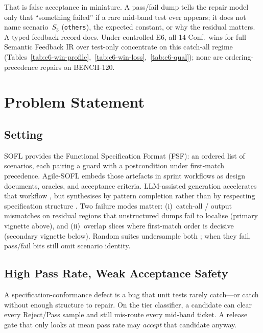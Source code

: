 That is false acceptance in miniature.
A pass/fail dump tells the repair model only that ``something failed'' if a
rare mid-band test ever appears; it does not name scenario~$S_3$
(\texttt{others}), the expected constant, or why the residual matters.
A typed feedback record does.
Under controlled E6, all 14 Conf.\ wins for full Semantic Feedback IR over
test-only concentrate on this catch-all regime
(Tables~\ref{tab:e6-win-profile},~\ref{tab:e6-win-loss},~\ref{tab:e6-qual});
none are ordering-precedence repairs on BENCH-120.



\section{Problem Statement}
\label{sec:intro:problem}

\subsection{Setting}
SOFL \citep{liu1998sofl,liu2004soflbook} provides the Functional Specification
Format (FSF): an ordered list of scenarios, each pairing a guard with a
postcondition under first-match precedence.
Agile-SOFL \citep{li2022qrs_companion} embeds those artefacts in sprint
workflows as design documents, oracles, and acceptance criteria.
LLM-assisted generation accelerates that workflow
\cite{chen2021codex,openai2023gpt4}, but synthesises by pattern completion
rather than by respecting specification structure
\cite{dakhel2023copilot,sun2024clover}.
Two failure modes matter: (i)~catch-all / output mismatches on residual
regions that unstructured dumps fail to localise (primary vignette above),
and (ii)~overlap slices where first-match order is decisive (secondary
vignette below).
Random suites undersample both \citep{zhu1997specification}; when they fail,
pass/fail bits still omit scenario identity.

\subsection{High Pass Rate, Weak Acceptance Safety}
A specification-conformance defect is a bug that unit tests rarely catch---or
catch without enough structure to repair.
On the tier classifier, a candidate can clear every Reject/Pass sample and
still mis-route every mid-band ticket.
A release gate that only looks at mean pass rate may \emph{accept} that
candidate anyway.

